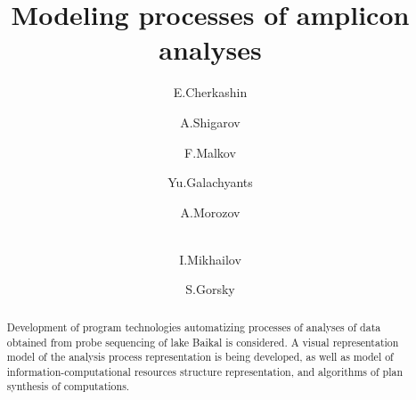 \documentclass[12pt]{llncs}
\begin{document}
\begin{englishtitle}

\title{Modeling  processes of amplicon analyses}

\author{E.Cherkashin
  \and
  A.Shigarov \and
  F.Malkov \and
  Yu.Galachyants \and
  A.Morozov \and\\
  I.Mikhailov \and
  S.Gorsky
}



\maketitle
\begin{abstract}
Development of program technologies automatizing processes of analyses of data obtained from probe sequencing of lake Baikal is considered.  A visual representation model of the analysis process representation is being developed, as well as model of information-computational resources structure representation, and algorithms of plan synthesis of computations.

\end{abstract}
\end{englishtitle}
\end{document}
